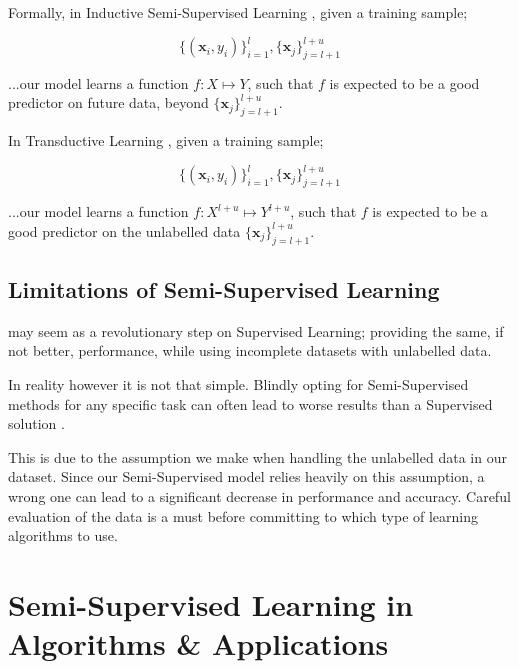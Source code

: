 Formally, in Inductive Semi-Supervised Learning \citep{zhu2009introduction}, given a training sample; 

\begin{equation}
\{(\bm{x}_i, y_i)\}^{l}_{i=1},\{\bm{x}_j\}^{l+u}_{j=l+1}
\end{equation}

...our model learns a function $f:X \mapsto Y$, such that $f$ is expected to be a good predictor on future data, beyond $\{\bm{x}_j\}^{l+u}_{j=l+1}$.

In Transductive Learning \citep{zhu2009introduction}, given a training sample;

\begin{equation}
\{(\bm{x}_i,y_i)\}^l_{i=1},\{\bm{x}_j\}^{l+u}_{j=l+1}
\end{equation}

...our model learns a function $f: X^{l+u} \mapsto Y^{l+u}$, such that $f$ is expected to be a good predictor on the unlabelled data $\{\bm{x}_j\}^{l+u}_{j=l+1}$.

\subsection{Limitations of Semi-Supervised Learning}\label{sec:limitations}

 may seem as a revolutionary step on Supervised Learning; providing the same, if not better, performance, while using incomplete datasets with unlabelled data.

In reality however it is not that simple. Blindly opting for Semi-Supervised methods for any specific task can often lead to worse results than a Supervised solution \citep{zhu2009introduction}. 

This is due to the assumption we make when handling the unlabelled data in our dataset. Since our Semi-Supervised model relies heavily on this assumption, a wrong one can lead to a significant decrease in performance and accuracy. Careful evaluation of the data is a must before committing to which type of learning algorithms to use.

\section{Semi-Supervised Learning in Algorithms \& Applications}\label{sec:applications}

